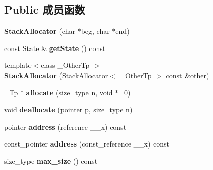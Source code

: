 \subsection*{Public 成员函数}
\begin{DoxyCompactItemize}
\item 
\mbox{\label{struct_stack_allocator_a11d6722090970aea4c404a381cb0d339}} 
{\bfseries Stack\+Allocator} (char $\ast$beg, char $\ast$end)
\item 
\mbox{\label{struct_stack_allocator_a5dec1025d666cf46c1f7208e8a6c76d4}} 
const \hyperlink{struct_state}{State} \& {\bfseries get\+State} () const
\item 
\mbox{\label{struct_stack_allocator_ab1db832c8f44b05213793b8522198e34}} 
{\footnotesize template$<$class \+\_\+\+Other\+Tp $>$ }\\{\bfseries Stack\+Allocator} (\hyperlink{struct_stack_allocator}{Stack\+Allocator}$<$ \+\_\+\+Other\+Tp $>$ const \&other)
\item 
\mbox{\label{struct_stack_allocator_a0203ece568efe6edc734d5ae7e2ae3e6}} 
\+\_\+\+Tp $\ast$ {\bfseries allocate} (size\+\_\+type n, \hyperlink{interfacevoid}{void} $\ast$=0)
\item 
\mbox{\label{struct_stack_allocator_a9e67dedd9536c4f5d406b0deda6d17c6}} 
\hyperlink{interfacevoid}{void} {\bfseries deallocate} (pointer p, size\+\_\+type n)
\item 
\mbox{\label{struct_stack_allocator_ae3844de104a6ae6f90b766ac16a072bc}} 
pointer {\bfseries address} (reference \+\_\+\+\_\+x) const
\item 
\mbox{\label{struct_stack_allocator_a5a2f70a7bb9179aea445d3c872bbfeed}} 
const\+\_\+pointer {\bfseries address} (const\+\_\+reference \+\_\+\+\_\+x) const
\item 
\mbox{\label{struct_stack_allocator_aaa26099b0c6da3029d99957205c6fda0}} 
size\+\_\+type {\bfseries max\+\_\+size} () const
\item 
\mbox{\label{struct_stack_allocator_a8f41d7ba9dcd93465aca7a5e29a4feab}} 

\end{DoxyCompactItemize}

